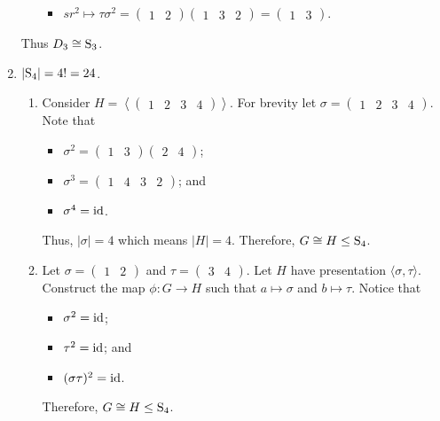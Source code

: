 \begin{enumerate}
\begin{itemize}
\begin{itemize}
            \item $sr^2 \mapsto \tau\sigma^2 = \begin{pmatrix}1 & 2\end{pmatrix}\begin{pmatrix}1 & 3 & 2\end{pmatrix} = \begin{pmatrix}1 & 3\end{pmatrix}$.
        \end{itemize}
    \end{itemize}
    Thus $D_3 \cong \mathrm{S}_{3}$.

    \item $|\mathrm{S}_{4}| = 4! = 24$.
    \begin{enumerate}[label=(\alph*)]
        \item Consider $H = \left\langle \begin{pmatrix}1 & 2 & 3 & 4\end{pmatrix} \right\rangle$. For brevity let $\sigma = \begin{pmatrix}1 & 2 & 3 & 4\end{pmatrix}$. Note that
        \begin{itemize}
            \item $\sigma^2 = \begin{pmatrix}1 & 3\end{pmatrix}\begin{pmatrix}2 & 4\end{pmatrix}$;
            \item $\sigma^3 = \begin{pmatrix}1 & 4 & 3 & 2\end{pmatrix}$; and
            \item $\sigma^4 = \mathrm{id}$.
        \end{itemize}
        Thus, $|\sigma| = 4$ which means $|H| = 4$. Therefore, $G \cong H \leq \mathrm{S}_{4}$.

        \item Let $\sigma = \begin{pmatrix}1 & 2\end{pmatrix}$ and $\tau = \begin{pmatrix}3 & 4\end{pmatrix}$. Let $H$ have presentation $\langle \sigma, \tau \rangle$. Construct the map $\phi: G \to H$ such that $a \mapsto \sigma$ and $b \mapsto \tau$. Notice that
        \begin{itemize}
            \item $\sigma^2 = \mathrm{id}$;
            \item $\tau^2 = \mathrm{id}$; and
            \item $(\sigma\tau)^2 = \mathrm{id}$.
        \end{itemize}
        Therefore, $G \cong H \leq \mathrm{S}_{4}$.
    \end{enumerate}
\end{enumerate}

